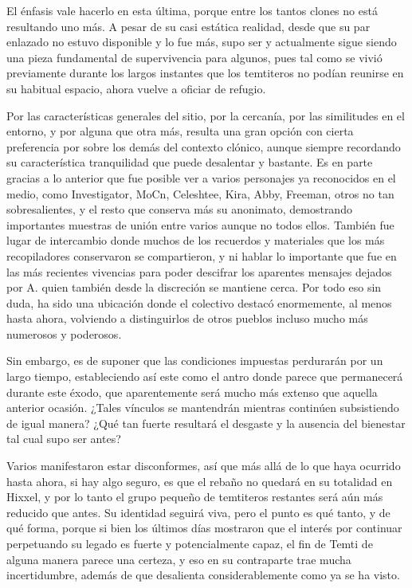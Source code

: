 \documentclass[
]{book}
\begin{document}
El énfasis vale hacerlo en esta última, porque entre los tantos clones no está resultando uno más. A pesar de su casi estática realidad, desde que su par enlazado no estuvo disponible y lo fue más, supo ser y actualmente sigue siendo una pieza fundamental de supervivencia para algunos, pues tal como se vivió previamente durante los largos instantes que los temtiteros no podían reunirse en su habitual espacio, ahora vuelve a oficiar de refugio.

Por las características generales del sitio, por la cercanía, por las similitudes en el entorno, y por alguna que otra más, resulta una gran opción con cierta preferencia por sobre los demás del contexto clónico, aunque siempre recordando su característica tranquilidad que puede desalentar y bastante. Es en parte gracias a lo anterior que fue posible ver a varios personajes ya reconocidos en el medio, como Investigator, MoCn, Celeshtee, Kira, Abby, Freeman, otros no tan sobresalientes, y el resto que conserva más su anonimato, demostrando importantes muestras de unión entre varios aunque no todos ellos. También fue lugar de intercambio donde muchos de los recuerdos y materiales que los más recopiladores conservaron se compartieron, y ni hablar lo importante que fue en las más recientes vivencias para poder descifrar los aparentes mensajes dejados por A. quien también desde la discreción se mantiene cerca. Por todo eso sin duda, ha sido una ubicación donde el colectivo destacó enormemente, al menos hasta ahora, volviendo a distinguirlos de otros pueblos incluso mucho más numerosos y poderosos.

Sin embargo, es de suponer que las condiciones impuestas perdurarán por un largo tiempo, estableciendo así este como el antro donde parece que permanecerá durante este éxodo, que aparentemente será mucho más extenso que aquella anterior ocasión. ¿Tales vínculos se mantendrán mientras continúen subsistiendo de igual manera? ¿Qué tan fuerte resultará el desgaste y la ausencia del bienestar tal cual supo ser antes?

Varios manifestaron estar disconformes, así que más allá de lo que haya ocurrido hasta ahora, si hay algo seguro, es que el rebaño no quedará en su totalidad en Hixxel, y por lo tanto el grupo pequeño de temtiteros restantes será aún más reducido que antes. Su identidad seguirá viva, pero el punto es qué tanto, y de qué forma, porque si bien los últimos días mostraron que el interés por continuar perpetuando su legado es fuerte y potencialmente capaz, el fin de Temti de alguna manera parece una certeza, y eso en su contraparte trae mucha incertidumbre, además de que desalienta considerablemente como ya se ha visto.
\end{document}
